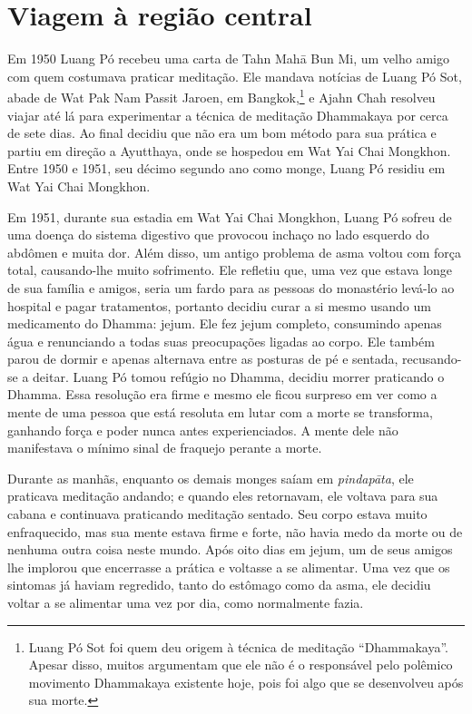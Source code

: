 \chapter{Viagem à região central}

Em 1950 Luang Pó recebeu uma carta de Tahn Mahā Bun Mi, um velho amigo
com quem costumava praticar meditação. Ele mandava notícias de Luang Pó
Sot, abade de Wat Pak Nam Passit Jaroen, em Bangkok,\footnote{Luang Pó
  Sot foi quem deu origem à técnica de meditação ``Dhammakaya''. Apesar
  disso, muitos argumentam que ele não é o responsável pelo polêmico
  movimento Dhammakaya existente hoje, pois foi algo que se desenvolveu
  após sua morte.} e Ajahn Chah resolveu viajar até lá para
experimentar a técnica de meditação Dhammakaya por cerca de sete dias.
Ao final decidiu que não era um bom método para sua prática e partiu em
direção a Ayutthaya, onde se hospedou em Wat Yai Chai Mongkhon. Entre
1950 e 1951, seu décimo segundo ano como monge, Luang Pó residiu em Wat
Yai Chai Mongkhon.

Em 1951, durante sua estadia em Wat Yai Chai Mongkhon, Luang Pó sofreu
de uma doença do sistema digestivo que provocou inchaço no lado esquerdo
do abdômen e muita dor. Além disso, um antigo problema de asma voltou
com força total, causando-lhe muito sofrimento. Ele refletiu que, uma
vez que estava longe de sua família e amigos, seria um fardo para as
pessoas do monastério levá-lo ao hospital e pagar tratamentos, portanto
decidiu curar a si mesmo usando um medicamento do Dhamma: jejum. Ele fez
jejum completo, consumindo apenas água e renunciando a todas suas
preocupações ligadas ao corpo. Ele também parou de dormir e apenas
alternava entre as posturas de pé e sentada, recusando-se a deitar.
Luang Pó tomou refúgio no Dhamma, decidiu morrer praticando o Dhamma.
Essa resolução era firme e mesmo ele ficou surpreso em ver como a mente
de uma pessoa que está resoluta em lutar com a morte se transforma,
ganhando força e poder nunca antes experienciados. A mente dele não
manifestava o mínimo sinal de fraquejo perante a morte.

Durante as manhãs, enquanto os demais monges saíam em \emph{pindapāta},
ele praticava meditação andando; e quando eles retornavam, ele voltava
para sua cabana e continuava praticando meditação sentado. Seu corpo
estava muito enfraquecido, mas sua mente estava firme e forte, não havia
medo da morte ou de nenhuma outra coisa neste mundo. Após oito dias em
jejum, um de seus amigos lhe implorou que encerrasse a prática e
voltasse a se alimentar. Uma vez que os sintomas já haviam regredido,
tanto do estômago como da asma, ele decidiu voltar a se alimentar uma
vez por dia, como normalmente fazia.

